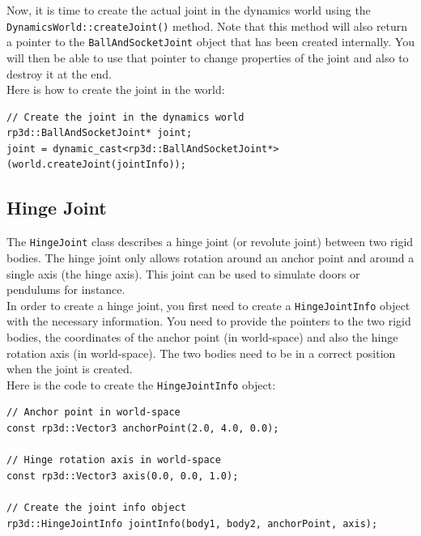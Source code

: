 \documentclass[a4paper,12pt]{article}
\begin{document}
    \vspace{0.6cm}

    Now, it is time to create the actual joint in the dynamics world using the \texttt{DynamicsWorld::createJoint()} method.
    Note that this method will also return a pointer to the \texttt{BallAndSocketJoint} object that has been created internally. You will then
    be able to use that pointer to change properties of the joint and also to destroy it at the end. \\

    Here is how to create the joint in the world: \\

    \begin{lstlisting}
// Create the joint in the dynamics world
rp3d::BallAndSocketJoint* joint;
joint = dynamic_cast<rp3d::BallAndSocketJoint*>(world.createJoint(jointInfo));
  \end{lstlisting}

    \vspace{0.6cm}

    \subsection{Hinge Joint}

    The \texttt{HingeJoint} class describes a hinge joint (or revolute joint) between two rigid bodies. The hinge joint only allows rotation around an anchor point and
    around a single axis (the hinge axis). This joint can be used to simulate doors or pendulums for instance. \\

    In order to create a hinge joint, you first need to create a \texttt{HingeJointInfo} object with the necessary information. You need to provide the pointers to the
    two rigid bodies, the coordinates of the anchor point (in world-space) and also the hinge rotation axis (in world-space). The two bodies need to be in a correct position
    when the joint is created. \\

    Here is the code to create the \texttt{HingeJointInfo} object: \\

    \begin{lstlisting}
// Anchor point in world-space
const rp3d::Vector3 anchorPoint(2.0, 4.0, 0.0);

// Hinge rotation axis in world-space
const rp3d::Vector3 axis(0.0, 0.0, 1.0);

// Create the joint info object
rp3d::HingeJointInfo jointInfo(body1, body2, anchorPoint, axis);
  \end{lstlisting}
\end{document}
